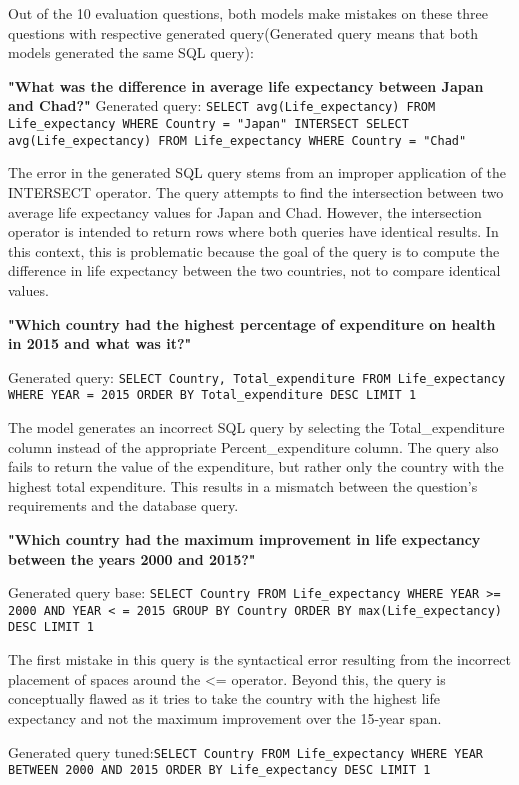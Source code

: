 \documentclass[11pt]{article}
\begin{document}
Out of the 10 evaluation questions, both models make mistakes on these three questions with respective generated query(Generated query means that both models generated the same SQL query):

\textbf{"What was the difference in average life expectancy between Japan and Chad?"}
Generated query: \texttt{SELECT avg(Life\_expectancy) FROM Life\_expectancy WHERE Country = "Japan" INTERSECT SELECT avg(Life\_expectancy) FROM Life\_expectancy WHERE Country = "Chad"}

The error in the generated SQL query stems from an improper application of the INTERSECT operator. The query attempts to find the intersection between two average life expectancy values for Japan and Chad. However, the intersection operator is intended to return rows where both queries have identical results. In this context, this is problematic because the goal of the query is to compute the difference in life expectancy between the two countries, not to compare identical values. 

\textbf{"Which country had the highest percentage of expenditure on health in 2015 and what was it?"}

Generated query: \texttt{SELECT Country, Total\_expenditure FROM Life\_expectancy WHERE YEAR = 2015 ORDER BY Total\_expenditure DESC LIMIT 1}

The model generates an incorrect SQL query by selecting the Total\_expenditure column instead of the appropriate Percent\_expenditure column. The query also fails to return the value of the expenditure, but rather only the country with the highest total expenditure. This results in a mismatch between the question's requirements and the database query.

\textbf{"Which country had the maximum improvement in life expectancy between the years 2000 and 2015?"}

Generated query base: \texttt{SELECT Country FROM Life\_expectancy WHERE YEAR >= 2000 AND YEAR < = 2015 GROUP BY Country ORDER BY max(Life\_expectancy) DESC LIMIT 1}

 The first mistake in this query is the syntactical error resulting from the incorrect placement of spaces around the <= operator. Beyond this, the query is conceptually flawed as it tries to take the country with the highest life expectancy and not the maximum improvement over the 15-year span.

Generated query tuned:\texttt{SELECT Country FROM Life\_expectancy WHERE YEAR BETWEEN 2000 AND 2015 ORDER BY Life\_expectancy DESC LIMIT 1}
\end{document}
